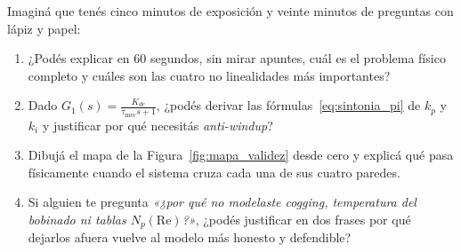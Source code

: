 \documentclass[11pt,a4paper,oneside]{book}
\begin{document}
\begin{lapizypapel}
Imaginá que tenés cinco minutos de exposición y veinte minutos de preguntas con
lápiz y papel:
\begin{enumerate}[leftmargin=1.5em]
  \item ¿Podés explicar en 60 segundos, sin mirar apuntes, cuál es el problema
        físico completo y cuáles son las cuatro no linealidades más importantes?
  \item Dado $G_1(s) = \frac{K_{dc}}{\tau_{\text{mec}}s + 1}$, ¿podés derivar
        las fórmulas~\eqref{eq:sintonia_pi} de $k_p$ y $k_i$ y justificar por
        qué necesitás \emph{anti-windup}?
  \item Dibujá el mapa de la Figura~\ref{fig:mapa_validez} desde cero y explicá
        qué pasa físicamente cuando el sistema cruza cada una de sus cuatro
        paredes.
  \item Si alguien te pregunta \emph{«¿por qué no modelaste cogging, temperatura
        del bobinado ni tablas $N_p(\mathrm{Re})$?»}, ¿podés justificar en dos
        frases por qué dejarlos afuera vuelve al modelo más honesto y
        defendible?
\end{enumerate}
\end{lapizypapel}
\end{document}
